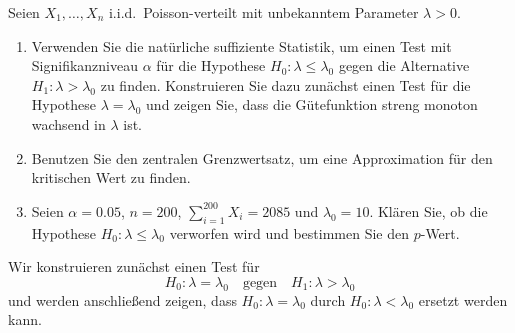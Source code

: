 Seien $X_1,\ldots,X_n$ i.i.d.\ Poisson-verteilt mit unbekanntem Parameter $\lambda>0$.
\begin{enumerate}
    \item Verwenden Sie die natürliche suffiziente Statistik, um einen Test mit
        Signifikanzniveau $\alpha$ für die Hypothese $H_0:
        \lambda\leq\lambda_0$ gegen die Alternative $H_1: \lambda>\lambda_0$ zu
        finden. Konstruieren Sie dazu zunächst einen Test für die Hypothese
        $\lambda=\lambda_0$ und zeigen Sie, dass die Gütefunktion streng
        monoton wachsend in $\lambda$ ist. 
     \item Benutzen Sie den zentralen Grenzwertsatz, um eine Approximation für
         den kritischen Wert zu finden.
     \item Seien $\alpha=0.05$, $n=200$, $\sum_{i=1}^{200} X_i= 2085$ und
         $\lambda_0=10$. Klären Sie, ob die Hypothese $H_0:
         \lambda\leq\lambda_0$ verworfen wird und bestimmen Sie den $p$-Wert.
\end{enumerate}

\solution
Wir konstruieren zunächst einen Test für 
\begin{equation*}
    H_0 : \lambda=\lambda_0 \quad \textrm{gegen} \quad H_1 : \lambda>\lambda_0
\end{equation*}
und werden anschließend zeigen, dass $H_0: \lambda=\lambda_0$ durch
$H_0: \lambda<\lambda_0$ ersetzt werden kann.

